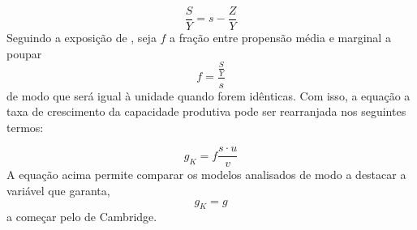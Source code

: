 \begin{equation}
\label{Poupanca_Super}
    \frac{S}{Y} = s - \frac{Z}{Y}
\end{equation}
Seguindo a exposição de \textcite{serrano_sraffian_1995}, seja $f$ a fração entre propensão média e marginal a poupar
$$
f = \frac{\frac{S}{Y}}{s}
$$
de modo que será igual à unidade quando forem idênticas. 
Com isso, a equação a taxa de crescimento da capacidade produtiva pode ser rearranjada nos seguintes termos:


\begin{equation}
 \label{EqGeral}   
g_K =  f\frac{s\cdot u}{v}
\end{equation}
A equação acima permite comparar os modelos analisados de modo a destacar a variável que garanta, 
$$
g_K = g
$$
a começar pelo de Cambridge.
